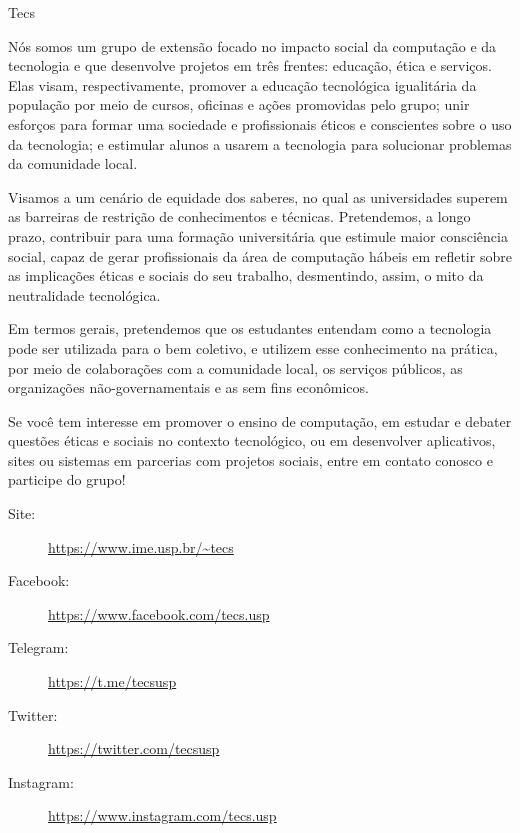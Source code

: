 
\begin{subsecao}{Tecs}


Nós somos um grupo de extensão focado no impacto social da computação e da 
tecnologia e que desenvolve projetos em três frentes: educação, ética e 
serviços. Elas visam, respectivamente, promover a educação tecnológica 
igualitária da população por meio de cursos, oficinas e ações promovidas pelo 
grupo; unir esforços para formar uma sociedade e profissionais éticos e
conscientes sobre o uso da tecnologia; e estimular alunos a usarem a tecnologia 
para solucionar problemas da comunidade local.

Visamos a um cenário de equidade dos saberes, no qual as universidades superem
as barreiras de restrição de conhecimentos e técnicas. Pretendemos, a longo prazo,
contribuir para uma formação universitária que estimule maior consciência social, 
capaz de gerar profissionais da área de computação hábeis em refletir sobre as 
implicações éticas e sociais do seu trabalho, desmentindo, assim, o mito da 
neutralidade tecnológica.

Em termos gerais, pretendemos que os estudantes entendam como a tecnologia pode
ser utilizada para o bem coletivo, e utilizem esse conhecimento na prática, por
meio de colaborações com a comunidade local, os serviços públicos, as
organizações não-governamentais e as sem fins econômicos. 

Se você tem interesse em promover o ensino de computação, em estudar e debater 
questões éticas e sociais no contexto tecnológico, ou em desenvolver aplicativos,
sites ou sistemas em parcerias com projetos sociais, entre em contato conosco e 
participe do grupo!

\vspace{-1em}
\begin{description}
  \item[Site:] \url{https://www.ime.usp.br/~tecs}
  \item[Facebook:] \url{https://www.facebook.com/tecs.usp}
  \item[Telegram:] \url{https://t.me/tecsusp}
  \item[Twitter:] \url{https://twitter.com/tecsusp}
  \item[Instagram:] \url{https://www.instagram.com/tecs.usp} 
\end{description}

\end{subsecao}
